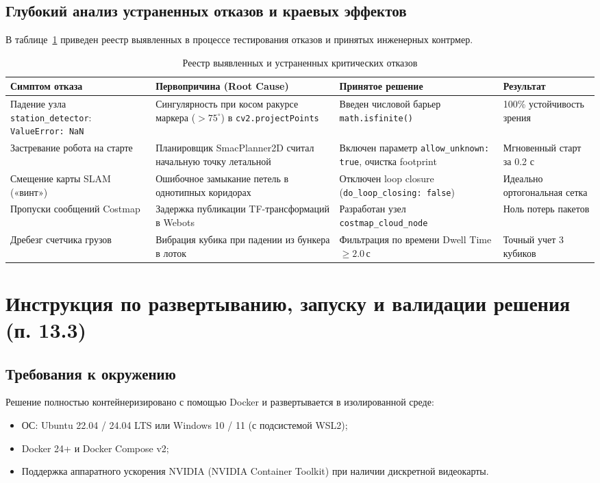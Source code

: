 \documentclass[a4paper,11pt]{article}
\begin{document}
\subsection{Глубокий анализ устраненных отказов и краевых эффектов}
В таблице~\ref{tab:fault_analysis} приведен реестр выявленных в процессе тестирования отказов и принятых инженерных контрмер.

\begin{table}[htbp]
\centering
\small
\begin{tabularx}{\textwidth}{p{3.2cm}p{4.2cm}p{4.0cm}X}
\toprule
\textbf{Симптом отказа} & \textbf{Первопричина (Root Cause)} & \textbf{Принятое решение} & \textbf{Результат} \\
\midrule
Падение узла \texttt{station\_detector}: \texttt{ValueError: NaN} & Сингулярность при косом ракурсе маркера ($>75^\circ$) в \texttt{cv2.projectPoints} & Введен числовой барьер \texttt{math.isfinite()} & 100\% устойчивость зрения \\
Застревание робота на старте & Планировщик SmacPlanner2D считал начальную точку летальной & Включен параметр \texttt{allow\_unknown: true}, очистка footprint & Мгновенный старт за 0.2 с \\
Смещение карты SLAM («винт») & Ошибочное замыкание петель в однотипных коридорах & Отключен loop closure (\texttt{do\_loop\_closing: false}) & Идеально ортогональная сетка \\
Пропуски сообщений Costmap & Задержка публикации TF-трансформаций в Webots & Разработан узел \texttt{costmap\_cloud\_node} & Ноль потерь пакетов \\
Дребезг счетчика грузов & Вибрация кубика при падении из бункера в лоток & Фильтрация по времени Dwell Time $\ge 2.0$\,с & Точный учет 3 кубиков \\
\bottomrule
\end{tabularx}
\caption{Реестр выявленных и устраненных критических отказов}
\label{tab:fault_analysis}
\end{table}

\section{Инструкция по развертыванию, запуску и валидации решения (п. 13.3)}

\subsection{Требования к окружению}
Решение полностью контейнеризировано с помощью Docker и развертывается в изолированной среде:
\begin{itemize}[noitemsep]
    \item ОС: Ubuntu 22.04 / 24.04 LTS или Windows 10 / 11 (с подсистемой WSL2);
    \item Docker 24+ и Docker Compose v2;
    \item Поддержка аппаратного ускорения NVIDIA (NVIDIA Container Toolkit) при наличии дискретной видеокарты.
\end{itemize}
\end{document}
